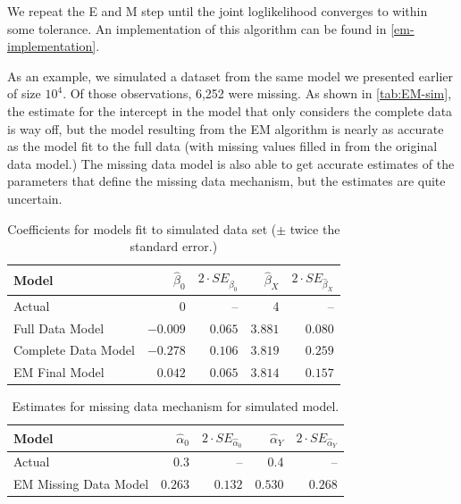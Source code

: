 \documentclass[12pt,twoside]{reedthesis}
\begin{document}
  We repeat the E and M step until the joint loglikelihood converges to
  within some tolerance. An implementation of this algorithm can be found
  in \autoref{em-implementation}.
  
  As an example, we simulated a dataset from the same model we presented
  earlier of size \(10^4\). Of those observations, 6,252 were missing. As
  shown in \autoref{tab:EM-sim}, the estimate for the intercept in the
  model that only considers the complete data is way off, but the model
  resulting from the EM algorithm is nearly as accurate as the model fit
  to the full data (with missing values filled in from the original data
  model.) The missing data model is also able to get accurate estimates of
  the parameters that define the missing data mechanism, but the estimates
  are quite uncertain.
  
  \begin{table}[htb]
  \caption{Coefficients for models fit to simulated data set ($\pm$ twice the
  standard error.) \label{tab:EM-sim}}
  \centering
  \begin{tabular}{lrrrr}
  \toprule
  Model & $\hat{\beta}_0$ & $2 \cdot SE_{\hat{\beta}_0}$  & 
  $\hat{\beta}_X$ &  $2 \cdot SE_{\hat{\beta}_X}$\\
  \midrule
  Actual & 0 & -- & 4 & --\\
  Full Data Model & $-0.009$ &  $0.065$ & $3.881$ &  $0.080$\\
  Complete Data Model & $-0.278$ & $0.106$ & $3.819$ &  $0.259$\\
  EM Final Model & $0.042$ & $0.065$ & $3.814$ &  $0.157$\\
  \bottomrule
  \end{tabular}
  \end{table}
  
  \begin{table}[htb]
  \caption{Estimates for missing data mechanism for simulated model. \label{tab:EM-sim-missing}}
  \centering
  \begin{tabular}{lrrrr}
  \toprule
  Model & $\hat{\alpha}_0$ & $2 \cdot SE_{\hat{\alpha}_0}$ 
  & $\hat{\alpha}_Y$ &  $2 \cdot SE_{\hat{\alpha}_Y}$\\
  \midrule
  Actual & 0.3 & -- & 0.4 & --\\
  EM Missing Data Model & $0.263$ & $0.132$ & $0.530$ &  $0.268$\\
  \bottomrule
  \end{tabular}
  \end{table}
  
\end{document}
